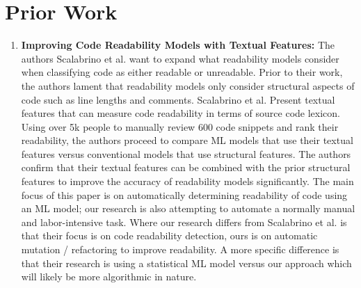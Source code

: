 \documentclass{article}
\begin{document}
\section{Prior Work}
\begin{enumerate}
    

    \item \textbf{Improving Code Readability Models with Textual Features:} The authors Scalabrino et al.\cite{7503707} want to expand what readability models consider when classifying code as either readable or unreadable. Prior to their work, the authors lament that readability models only consider structural aspects of code such as line lengths and comments. Scalabrino et al. Present textual features that can measure code readability in terms of source code lexicon. Using over 5k people to manually review 600 code snippets and rank their readability, the authors proceed to compare ML models that use their textual features versus conventional models that use structural features. The authors confirm that their textual features can be combined with the prior structural features to improve the accuracy of readability models significantly. The main focus of this paper is on automatically determining readability of code using an ML model; our research is also attempting to automate a normally manual and labor-intensive task. Where our research differs from Scalabrino et al. is that their focus is on code readability detection, ours is on automatic mutation / refactoring to improve readability. A more specific difference is that their research is using a statistical ML model versus our approach which will likely be more algorithmic in nature.


\end{enumerate}
\end{document}
